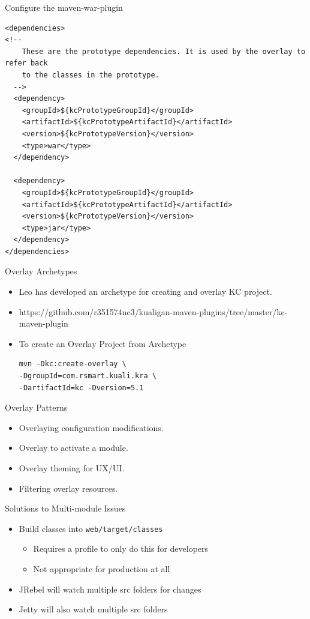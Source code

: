 \documentclass[xcolor=dvipsnames,14pt,professionalfonts]{beamer}
\begin{document}
\begin{frame}[fragile]{Configure the maven-war-plugin}
  \begin{verbatim}
<dependencies>
<!--
    These are the prototype dependencies. It is used by the overlay to refer back
    to the classes in the prototype.
  -->
  <dependency>
    <groupId>${kcPrototypeGroupId}</groupId>
    <artifactId>${kcPrototypeArtifactId}</artifactId>
    <version>${kcPrototypeVersion}</version>
    <type>war</type>
  </dependency>
  
  <dependency>
    <groupId>${kcPrototypeGroupId}</groupId>
    <artifactId>${kcPrototypeArtifactId}</artifactId>
    <version>${kcPrototypeVersion}</version>
    <type>jar</type>
  </dependency>
</dependencies>
  \end{verbatim}
\end{frame}

\begin{frame}[fragile]{Overlay Archetypes}
  \begin{itemize}
  \item Leo has developed an archetype for creating and overlay KC project.
  \item https://github.com/r351574nc3/kualigan-maven-plugins/tree/master/kc-maven-plugin
  \item To create an Overlay Project from Archetype
  \begin{verbatim}
mvn -Dkc:create-overlay \
-DgroupId=com.rsmart.kuali.kra \
-DartifactId=kc -Dversion=5.1
  \end{verbatim}
  \end{itemize}
\end{frame}

\begin{frame}{Overlay Patterns}
  \begin{itemize}
    \item Overlaying configuration modifications.
    \item Overlay to activate a module.
    \item Overlay theming for UX/UI.
    \item Filtering overlay resources.
  \end{itemize}
\end{frame}

\begin{frame}{Solutions to Multi-module Issues}
  \begin{itemize}
    \item Build classes into \texttt{web/target/classes}
      \begin{itemize}
        \item Requires a profile to only do this for developers
        \item Not appropriate for production at all
      \end{itemize}
    \item JRebel will watch multiple src folders for changes
    \item Jetty will also watch multiple src folders
  \end{itemize}
\end{frame}
\end{document}
